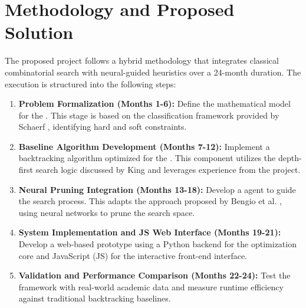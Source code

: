 
\section{Methodology and Proposed Solution}
The proposed project follows a hybrid methodology that integrates classical combinatorial search with neural-guided heuristics over a 24-month duration. The execution is structured into the following steps:

\begin{enumerate}
    \item \textbf{Problem Formalization (Months 1-6):} Define the mathematical model for the \PSTP. This stage is based on the classification framework provided by Schaerf \cite{ref1}, identifying hard and soft constraints.
    \item \textbf{Baseline Algorithm Development (Months 7-12):} Implement a backtracking algorithm optimized for the \SSP. This component utilizes the depth-first search logic discussed by King \cite{ref2} and leverages experience from the \UNI \FIIS project.
    \item \textbf{Neural Pruning Integration (Months 13-18):} Develop a \DRL agent to guide the search process. This adapts the approach proposed by Bengio et al. \cite{ref3}, using neural networks to prune the search space.
    \item \textbf{System Implementation and JS Web Interface (Months 19-21):} Develop a web-based prototype using a Python backend for the optimization core and JavaScript (JS) for the interactive front-end interface.
    \item \textbf{Validation and Performance Comparison (Months 22-24):} Test the framework with real-world academic data and measure runtime efficiency against traditional backtracking baselines.
\end{enumerate}
